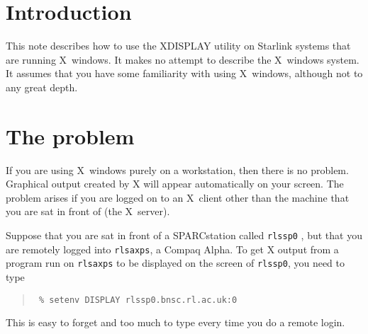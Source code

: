 \documentclass[twoside,11pt]{article}
\newcommand{\stardocinitials}  {SUN}
\newcommand{\stardocnumber}    {129.5}
\newcommand{\stardocname}{\stardocinitials /\stardocnumber}
\newenvironment{latexonly}{}{}
\newcommand{\xlabel}[1]{}
\renewcommand{\_}{\texttt{\symbol{95}}}
\renewcommand{\thepage}{\roman{page}}
\begin{document}
\renewcommand{\thepage}{\arabic{page}}
\setcounter{page}{1}


\section{\label{intro}\xlabel{intro}Introduction}

This note describes how to use the XDISPLAY utility on Starlink systems
that are running X~windows.  It makes no attempt to describe the
X~windows system.  It assumes that you have some familiarity with using
X~windows, although not to any great depth.

\section{\label{problem}\xlabel{problem}The problem}

If you are using X~windows purely on a workstation, then there is no
problem.  Graphical output created by X will appear automatically on
your screen.  The problem arises if you are logged on to an X~client
other than the machine that you are sat in front of (the X~server).

Suppose that you are sat in front of a SPARCstation called \texttt{rlssp0}
, but that you are remotely logged into \texttt{rlsaxps}, a Compaq
Alpha.  To get X output from a program run on \texttt{rlsaxps} to be
displayed on the screen of \texttt{rlssp0}, you need to type

\begin{quote}\texttt{
\% setenv DISPLAY rlssp0.bnsc.rl.ac.uk:0
}
\end{quote}

This is easy to forget and too much to type every time you do a remote
login.
\end{document}
